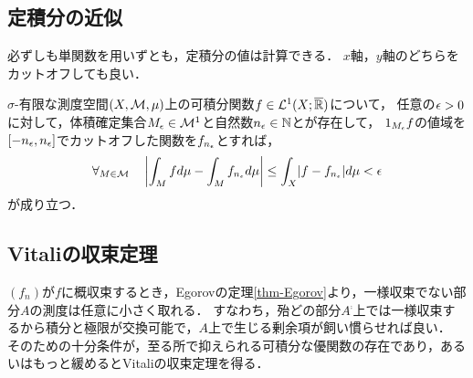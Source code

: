 \documentclass[uplatex, dvipdfmx]{jsreport}
\begin{document}
\subsection{定積分の近似}

\begin{tcolorbox}[colframe=ForestGreen, colback=ForestGreen!10!white,breakable,colbacktitle=ForestGreen!40!white,coltitle=black,fonttitle=\bfseries\sffamily,
title=]
    必ずしも単関数を用いずとも，定積分の値は計算できる．
    $x$軸，$y$軸のどちらをカットオフしても良い．
\end{tcolorbox}

\begin{theorem}
    $\sigma$-有限な測度空間$(X,\mathcal{M},\mu)$上の可積分関数$f\in\mathcal{L}^1(X;\overline{\mathbb{R}})$について，
    任意の$\epsilon>0$に対して，体積確定集合$M_\epsilon\in\mathcal{M}^1$と自然数$n_\epsilon\in\mathbb{N}$とが存在して，
    $1_{M_\epsilon}f$の値域を$[-n_\epsilon,n_\epsilon]$でカットオフした関数を$f_{n_\epsilon}$とすれば，
    \[\forall_{M\in\mathcal{M}}\quad\left|\int_Mfd\mu-\int_Mf_{n_\epsilon}d\mu\right|\le\int_X\lvert f-f_{n_\epsilon}\rvert d\mu<\epsilon\]
    が成り立つ．
\end{theorem}

\subsection{Vitaliの収束定理}

\begin{tcolorbox}[colframe=ForestGreen, colback=ForestGreen!10!white,breakable,colbacktitle=ForestGreen!40!white,coltitle=black,fonttitle=\bfseries\sffamily,
title=Lebesgueの優収束定理の描像と精緻化]
    $(f_n)$が$f$に概収束するとき，Egorovの定理\ref{thm-Egorov}より，一様収束でない部分$A$の測度は任意に小さく取れる．
    すなわち，殆どの部分$A^\comp$上では一様収束するから積分と極限が交換可能で，$A$上で生じる剰余項が飼い慣らせれば良い．
    そのための十分条件が，至る所で抑えられる可積分な優関数の存在であり，あるいはもっと緩めるとVitaliの収束定理を得る．
\end{tcolorbox}
\end{document}
